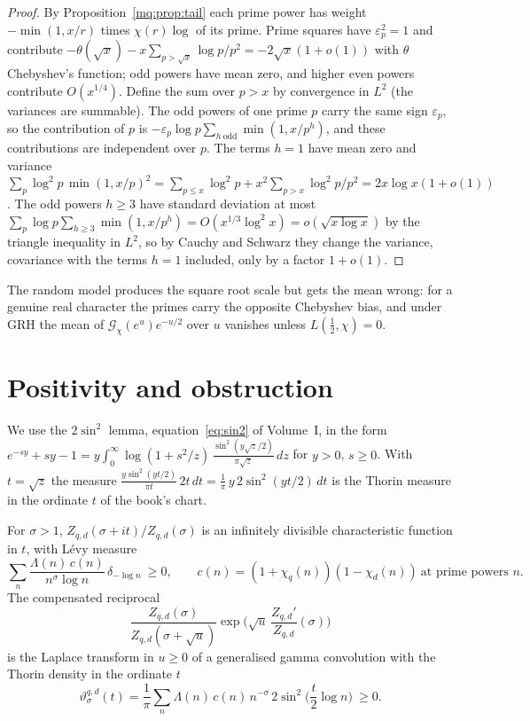 \begin{proof}
By Proposition~\ref{mq:prop:tail} each prime power has weight $-\min(1,x/r)$ times $\chi(r)\log$ of its prime. Prime squares have $\varepsilon_p^2=1$ and contribute $-\theta(\sqrt x)-x\sum_{p>\sqrt x}\log p/p^2=-2\sqrt x(1+o(1))$ with $\theta$ Chebyshev's function; odd powers have mean zero, and higher even powers contribute $O(x^{1/4})$. Define the sum over $p>x$ by convergence in $L^2$ (the variances are summable). The odd powers of one prime $p$ carry the same sign $\varepsilon_p$, so the contribution of $p$ is $-\varepsilon_p\log p\sum_{h\ \mathrm{odd}}\min(1,x/p^h)$, and these contributions are independent over $p$. The terms $h=1$ have mean zero and variance $\sum_p\log^2p\,\min(1,x/p)^2=\sum_{p\le x}\log^2p+x^2\sum_{p>x}\log^2p/p^2=2x\log x(1+o(1))$. The odd powers $h\ge3$ have standard deviation at most $\sum_p\log p\sum_{h\ge3}\min(1,x/p^h)=O(x^{1/3}\log^2x)=o(\sqrt{x\log x})$ by the triangle inequality in $L^2$, so by Cauchy and Schwarz they change the variance, covariance with the terms $h=1$ included, only by a factor $1+o(1)$.
\end{proof}

The random model produces the square root scale but gets the mean wrong: for a genuine real character the primes carry the opposite Chebyshev bias, and under GRH the mean of $\mathcal G_\chi(e^u)e^{-u/2}$ over $u$ vanishes unless $L(\frac12,\chi)=0$.

\section{Positivity and obstruction}\label{mq:sec:combo}

We use the $2\sin^2$ lemma, equation~\eqref{eq:sin2} of Volume~I, in the form $e^{-sy}+sy-1=y\int_0^\infty\log(1+s^2/z)\,\frac{\sin^2(y\sqrt z/2)}{\pi\sqrt z}\,dz$ for $y>0$, $s\ge0$. With $t=\sqrt z$ the measure $\frac{y\sin^2(yt/2)}{\pi t}\,2t\,dt=\frac1\pi\,y\,2\sin^2(yt/2)\,dt$ is the Thorin measure in the ordinate $t$ of the book's chart.

\begin{theorem}\label{mq:thm:combo}
For $\sigma>1$, $Z_{q,d}(\sigma+it)/Z_{q,d}(\sigma)$ is an infinitely divisible characteristic function in $t$, with L\'evy measure
\[
\sum_n\frac{\Lambda(n)\,c(n)}{n^{\sigma}\log n}\,\delta_{-\log n}\ \ge0,\qquad c(n)=(1+\chi_q(n))(1-\chi_d(n))\ \text{at prime powers }n.
\]
The compensated reciprocal
\[
\frac{Z_{q,d}(\sigma)}{Z_{q,d}(\sigma+\sqrt u)}\exp\Big(\sqrt u\,\frac{Z_{q,d}'}{Z_{q,d}}(\sigma)\Big)
\]
is the Laplace transform in $u\ge0$ of a generalised gamma convolution with the Thorin density in the ordinate $t$
\[
\vartheta^{q,d}_\sigma(t)=\frac1\pi\sum_n\Lambda(n)\,c(n)\,n^{-\sigma}\,2\sin^2\!\Big(\frac t2\log n\Big)\ \ge0 .
\]
\end{theorem}

